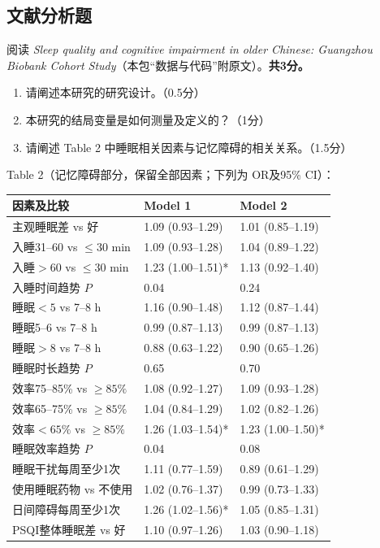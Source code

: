 \par\addvspace{8pt}\noindent\begin{minipage}{\linewidth}

\subsection{文献分析题}


阅读 \emph{Sleep quality and cognitive impairment in older Chinese: Guangzhou Biobank Cohort Study}（本包``数据与代码''附原文）。\textbf{共3分。}

\begin{enumerate}
\def\labelenumi{\arabic{enumi}.}
\tightlist
\item
  请阐述本研究的研究设计。（0.5分）
\item
  本研究的结局变量是如何测量及定义的？（1分）
\item
  请阐述 Table 2 中睡眠相关因素与记忆障碍的相关关系。（1.5分）
\end{enumerate}

Table 2（记忆障碍部分，保留全部因素；下列为 OR及95\% CI）：

\begin{center}\small\setlength{\tabcolsep}{4pt}\renewcommand{\arraystretch}{1.22}\begin{tabular}{@{}lll@{}}
\toprule
因素及比较 & Model 1 & Model 2 \\
\midrule

主观睡眠差 vs 好 & 1.09 (0.93--1.29) & 1.01 (0.85--1.19) \\
入睡31--60 vs \(\le30\) min & 1.09 (0.93--1.28) & 1.04 (0.89--1.22) \\
入睡\(>60\) vs \(\le30\) min & 1.23 (1.00--1.51)* & 1.13 (0.92--1.40) \\
入睡时间趋势 \(P\) & 0.04 & 0.24 \\
睡眠\(<5\) vs 7--8 h & 1.16 (0.90--1.48) & 1.12 (0.87--1.44) \\
睡眠5--6 vs 7--8 h & 0.99 (0.87--1.13) & 0.99 (0.87--1.13) \\
睡眠\(>8\) vs 7--8 h & 0.88 (0.63--1.22) & 0.90 (0.65--1.26) \\
睡眠时长趋势 \(P\) & 0.65 & 0.70 \\
效率75--85\% vs \(\ge85\%\) & 1.08 (0.92--1.27) & 1.09 (0.93--1.28) \\
效率65--75\% vs \(\ge85\%\) & 1.04 (0.84--1.29) & 1.02 (0.82--1.26) \\
效率\(<65\%\) vs \(\ge85\%\) & 1.26 (1.03--1.54)* & 1.23 (1.00--1.50)* \\
睡眠效率趋势 \(P\) & 0.04 & 0.08 \\
睡眠干扰每周至少1次 & 1.11 (0.77--1.59) & 0.89 (0.61--1.29) \\
使用睡眠药物 vs 不使用 & 1.02 (0.76--1.37) & 0.99 (0.73--1.33) \\
日间障碍每周至少1次 & 1.26 (1.02--1.56)* & 1.05 (0.85--1.31) \\
PSQI整体睡眠差 vs 好 & 1.10 (0.97--1.26) & 1.03 (0.90--1.18) \\
\bottomrule\end{tabular}\end{center}


\end{minipage}
